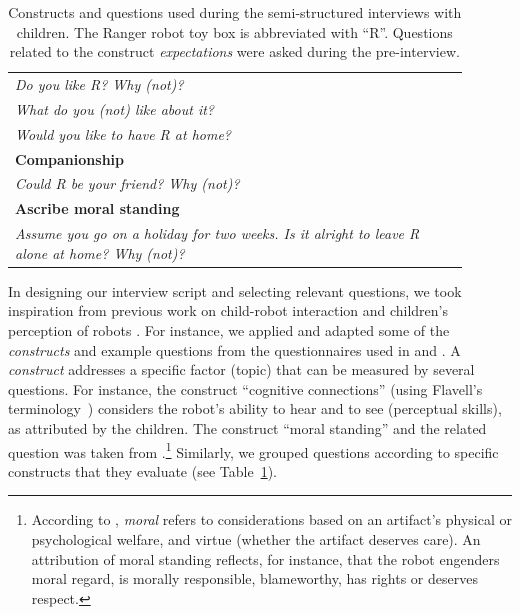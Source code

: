 \documentclass{sig-alternate}
\begin{document}
\begin{table}[h!t]
\begin{tabular}{p{0.9\linewidth}}
    \emph{Do you like R? Why (not)?} \\
    \emph{What do you (not) like about it?} \\
    \emph{Would you like to have R at home?} \\

    \toprule
    \textbf{Companionship} \\
    \midrule


    \emph{Could R be your friend? Why (not)?}\\

    \toprule
    \textbf{Ascribe moral standing} \\
    \midrule


    \emph{Assume you go on a holiday for two weeks. Is it alright to leave R
    alone at home? Why (not)?} \\

    \bottomrule

\end{tabular}

    \caption{\small Constructs and questions used during the semi-structured interviews
    with children. The Ranger robot toy box is abbreviated with ``R''. Questions
    related to the construct \emph{expectations} were asked during the
    pre-interview.}

    \label{tab:domino-questions} 

\end{table}


In designing our interview script and selecting relevant questions, we took
inspiration from previous work on child-robot interaction and children's
perception of robots
\cite{kahn_jr._robotic_2006,weiss_i_2009,leite_influence_2013}. For instance, we
applied and adapted some of the \emph{constructs} and example questions from the
questionnaires used in \cite{kahn_jr._robotic_2006} and \cite{weiss_i_2009}. A
\emph{construct} addresses a specific factor (topic) that can be measured by
several questions. For instance, the construct ``cognitive connections'' (using
Flavell's terminology~\cite{flavell1988development}) considers the robot's
ability to hear and to see (perceptual skills), as attributed by the children.
The construct ``moral standing'' and the related question was taken from
\cite{kahn_jr._robotic_2006}.\footnote{According to
\cite{kahn_jr._robotic_2006}, \textit{moral} refers to considerations based
on an artifact's physical or psychological welfare, and virtue (whether the
artifact deserves care). An attribution of moral standing reflects, for
instance, that the robot engenders moral regard, is morally responsible,
blameworthy, has rights or deserves respect.} Similarly, we grouped
questions according to specific constructs that they evaluate (see
Table~\ref{tab:domino-questions}).
\end{document}
